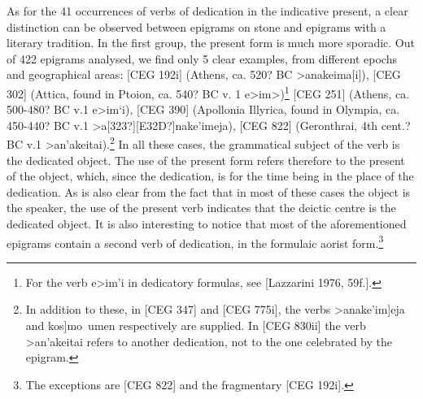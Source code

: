 \documentclass[amsthm,ebook]{saparticle}
\begin{document}
As for the 41 occurrences of verbs of dedication in the indicative present, a clear distinction can be observed between
epigrams on stone and epigrams with a literary tradition. In the first group, the present form is much more sporadic.
Out of 422 epigrams analysed, we find only 5 clear examples, from different epochs and geographical areas: [CEG 192i]
(Athens, ca. 520? BC \textgreek{>anakeima[i]), [}CEG 302] (Attica, found in Ptoion, ca. 540? BC v. 1
\textgreek{e>im>)}\footnote{ For the verb \textgreek{e>im'i }in dedicatory formulas, see [Lazzarini 1976, 59f.].} [CEG
251] (Athens, ca. 500-480? BC v.1 \textgreek{e>im`i}), [CEG 390] (Apollonia Illyrica, found in Olympia, ca. 450-440? BC
v.1 \textgreek{>a\textlatin{[323?]}}[E32D?]\textgreek{nake'imeja}), [CEG 822] (Geronthrai, 4th cent.? BC v.1
\textgreek{>an'akeitai).}\footnote{ In addition to these, in [CEG 347] and [CEG 775i], the verbs
\textgreek{>anake'im]eja }and \textgreek{kos]mo~umen }respectively are supplied. In [CEG 830ii] the verb
\textgreek{>an'akeitai }refers to another dedication, not to the one celebrated by the epigram.} In all these cases,
the grammatical subject of the verb is the dedicated object. The use of the present form refers therefore to the
present of the object, which, since the dedication, is for the time being in the place of the dedication. As is also
clear from the fact that in most of these cases the object is the speaker, the use of the present verb indicates that
the deictic centre is the dedicated object. It is also interesting to notice that most of the aforementioned epigrams
contain a second verb of dedication, in the formulaic aorist form.\footnote{ The exceptions are [CEG 822] and the
fragmentary [CEG 192i].} 
\end{document}
